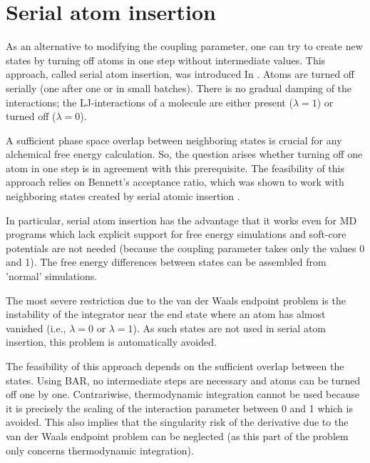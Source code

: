 \section{Serial atom insertion}

As an alternative to modifying the coupling parameter, one can
try to create new states by turning off atoms in one step without
intermediate values. This approach, called serial atom insertion, was introduced In \cite{Boresch.2011}. Atoms are turned off serially (one after one
or in small batches). There is no gradual damping of the interactions; the
LJ-interactions of a molecule are either present ($\lambda=1$) or
turned off ($\lambda=0$).

A sufficient phase space overlap between neighboring states is crucial
for any alchemical free energy calculation. So, the question arises
whether turning off one atom in one step is in agreement with this prerequisite. The feasibility of this approach relies on Bennett's acceptance
ratio, which was shown to work with neighboring states created
by serial atomic insertion \cite{Boresch.2011}.

In particular, serial atom insertion has the advantage that it works
even for MD programs which lack explicit support for free energy
simulations and soft-core potentials are not needed (because the coupling
parameter takes only the values 0 and 1). The free energy differences
between states can be assembled from 'normal' simulations.

The most severe restriction due to the van der Waals endpoint
problem is the instability of the integrator near the end state where an atom has almost vanished (i.e.,  $\lambda=0$ or  $\lambda=1$). As such states
are not used in serial atom insertion, this problem is automatically
avoided.

The feasibility of this approach depends on the sufficient overlap
between the states. Using BAR, no intermediate steps are necessary
and atoms can be turned off one by one. Contrariwise, thermodynamic
integration cannot be used because it is precisely the scaling of the
interaction parameter between 0 and 1 which is avoided. This also
implies that the singularity risk of the derivative due to the van
der Waals endpoint problem can be neglected (as this part of the problem
only concerns thermodynamic integration).